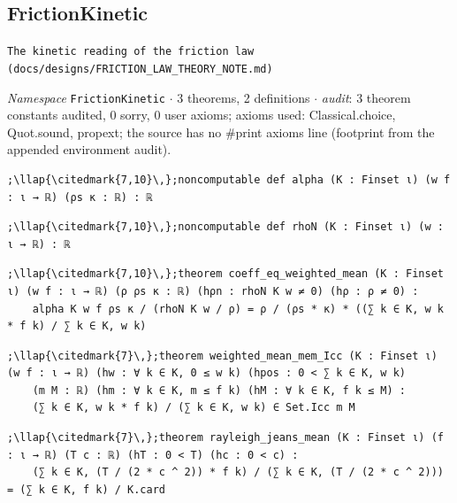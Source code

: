 \subsection{FrictionKinetic}\label{appA:FrictionKinetic}
{\footnotesize\raggedright\texttt{The kinetic reading of the friction law (docs/\allowbreak{}designs/\allowbreak{}FRICTION\_\allowbreak{}LAW\_\allowbreak{}THEORY\_\allowbreak{}NOTE.\allowbreak{}md)}\par}
{\footnotesize\raggedright\emph{Namespace} \texttt{FrictionKinetic} $\cdot$ 3 theorems, 2 definitions $\cdot$ \emph{audit}: 3 theorem constants audited, 0 sorry, 0 user axioms; axioms used: Classical.choice, Quot.sound, propext; the source has no \#print axioms line (footprint from the appended environment audit).\par}
\vspace{1pt}
\begin{lstlisting}[style=leancat]
;\llap{\citedmark{7,10}\,};noncomputable def alpha (K : Finset ι) (w f : ι → ℝ) (ρs κ : ℝ) : ℝ
\end{lstlisting}

\begin{lstlisting}[style=leancat]
;\llap{\citedmark{7,10}\,};noncomputable def rhoN (K : Finset ι) (w : ι → ℝ) : ℝ
\end{lstlisting}

\begin{lstlisting}[style=leancat]
;\llap{\citedmark{7,10}\,};theorem coeff_eq_weighted_mean (K : Finset ι) (w f : ι → ℝ) (ρ ρs κ : ℝ) (hρn : rhoN K w ≠ 0) (hρ : ρ ≠ 0) :
    alpha K w f ρs κ / (rhoN K w / ρ) = ρ / (ρs * κ) * ((∑ k ∈ K, w k * f k) / ∑ k ∈ K, w k)
\end{lstlisting}

\begin{lstlisting}[style=leancat]
;\llap{\citedmark{7}\,};theorem weighted_mean_mem_Icc (K : Finset ι) (w f : ι → ℝ) (hw : ∀ k ∈ K, 0 ≤ w k) (hpos : 0 < ∑ k ∈ K, w k)
    (m M : ℝ) (hm : ∀ k ∈ K, m ≤ f k) (hM : ∀ k ∈ K, f k ≤ M) :
    (∑ k ∈ K, w k * f k) / (∑ k ∈ K, w k) ∈ Set.Icc m M
\end{lstlisting}

\begin{lstlisting}[style=leancat]
;\llap{\citedmark{7}\,};theorem rayleigh_jeans_mean (K : Finset ι) (f : ι → ℝ) (T c : ℝ) (hT : 0 < T) (hc : 0 < c) :
    (∑ k ∈ K, (T / (2 * c ^ 2)) * f k) / (∑ k ∈ K, (T / (2 * c ^ 2))) = (∑ k ∈ K, f k) / K.card
\end{lstlisting}

